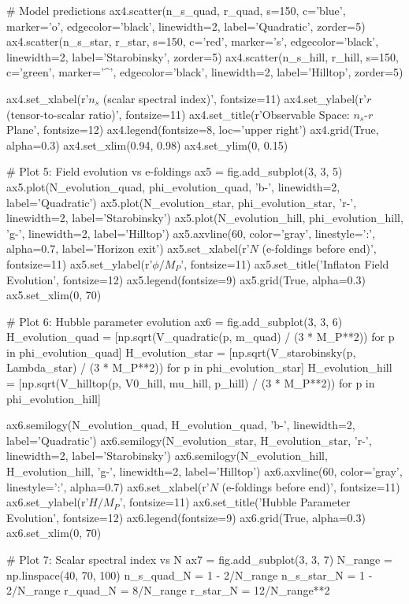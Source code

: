\documentclass[a4paper, 11pt]{article}
\begin{document}
\begin{pycode}
# Model predictions
ax4.scatter(n_s_quad, r_quad, s=150, c='blue', marker='o',
            edgecolor='black', linewidth=2, label='Quadratic', zorder=5)
ax4.scatter(n_s_star, r_star, s=150, c='red', marker='s',
            edgecolor='black', linewidth=2, label='Starobinsky', zorder=5)
ax4.scatter(n_s_hill, r_hill, s=150, c='green', marker='^',
            edgecolor='black', linewidth=2, label='Hilltop', zorder=5)

ax4.set_xlabel(r'$n_s$ (scalar spectral index)', fontsize=11)
ax4.set_ylabel(r'$r$ (tensor-to-scalar ratio)', fontsize=11)
ax4.set_title(r'Observable Space: $n_s$-$r$ Plane', fontsize=12)
ax4.legend(fontsize=8, loc='upper right')
ax4.grid(True, alpha=0.3)
ax4.set_xlim(0.94, 0.98)
ax4.set_ylim(0, 0.15)

# Plot 5: Field evolution vs e-foldings
ax5 = fig.add_subplot(3, 3, 5)
ax5.plot(N_evolution_quad, phi_evolution_quad, 'b-', linewidth=2, label='Quadratic')
ax5.plot(N_evolution_star, phi_evolution_star, 'r-', linewidth=2, label='Starobinsky')
ax5.plot(N_evolution_hill, phi_evolution_hill, 'g-', linewidth=2, label='Hilltop')
ax5.axvline(60, color='gray', linestyle=':', alpha=0.7, label='Horizon exit')
ax5.set_xlabel(r'$N$ (e-foldings before end)', fontsize=11)
ax5.set_ylabel(r'$\phi/M_P$', fontsize=11)
ax5.set_title('Inflaton Field Evolution', fontsize=12)
ax5.legend(fontsize=9)
ax5.grid(True, alpha=0.3)
ax5.set_xlim(0, 70)

# Plot 6: Hubble parameter evolution
ax6 = fig.add_subplot(3, 3, 6)
H_evolution_quad = [np.sqrt(V_quadratic(p, m_quad) / (3 * M_P**2))
                     for p in phi_evolution_quad]
H_evolution_star = [np.sqrt(V_starobinsky(p, Lambda_star) / (3 * M_P**2))
                     for p in phi_evolution_star]
H_evolution_hill = [np.sqrt(V_hilltop(p, V0_hill, mu_hill, p_hill) / (3 * M_P**2))
                     for p in phi_evolution_hill]

ax6.semilogy(N_evolution_quad, H_evolution_quad, 'b-', linewidth=2, label='Quadratic')
ax6.semilogy(N_evolution_star, H_evolution_star, 'r-', linewidth=2, label='Starobinsky')
ax6.semilogy(N_evolution_hill, H_evolution_hill, 'g-', linewidth=2, label='Hilltop')
ax6.axvline(60, color='gray', linestyle=':', alpha=0.7)
ax6.set_xlabel(r'$N$ (e-foldings before end)', fontsize=11)
ax6.set_ylabel(r'$H/M_P$', fontsize=11)
ax6.set_title('Hubble Parameter Evolution', fontsize=12)
ax6.legend(fontsize=9)
ax6.grid(True, alpha=0.3)
ax6.set_xlim(0, 70)

# Plot 7: Scalar spectral index vs N
ax7 = fig.add_subplot(3, 3, 7)
N_range = np.linspace(40, 70, 100)
n_s_quad_N = 1 - 2/N_range
n_s_star_N = 1 - 2/N_range
r_quad_N = 8/N_range
r_star_N = 12/N_range**2


\end{pycode}
\end{document}
